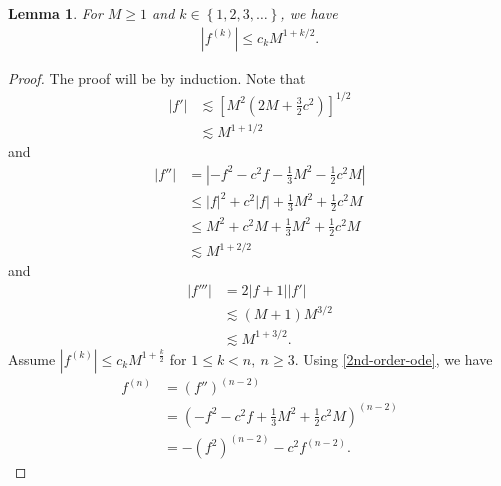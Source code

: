 \documentclass[12pt,reqno]{amsart}
\numberwithin{equation}{section}  %
\newtheorem{lemma}[theorem]{Lemma}
\begin{document}
%
%
%
%
%
%
%
%
%
\begin{lemma}
  For $M \ge 1$ and $k \in \left\{ 1,2,3,\dots \right\}$, we have
%
%
\begin{equation}
\begin{split}
  | f^{(k)} | \le c_{k} M^{1 + k/2}.
\end{split}
\label{eqn:deriv-bound}
\end{equation}
%
%
\label{lem:deriv-bound}
\end{lemma}
%
%
%
\begin{proof}
The proof will be by induction. Note that 
%
%
\begin{equation*}
\begin{split}
  | f' |
  & \lesssim \left [ M^{2}(2M + \frac{3}{2}c^{2}) \right]^{1/2}
  \\
  & \lesssim M^{1 + 1/2}
\end{split}
\end{equation*}
%
and
%
%
\begin{equation*}
\begin{split}
| f'' |
& = | -f^{2} - c^{2} f - \frac{1}{3} M^{2} - \frac{1}{2}c^{2} M
 |
\\
& \le | f |^{2} + c^{2} | f | + \frac{1}{3}M^{2} + \frac{1}{2}c^{2} M
\\
& \le M ^{2} +  c^{2} M  + \frac{1}{3}M^{2} + \frac{1}{2}c^{2} M
\\
& \lesssim M^{1 + 2/2}
\end{split}
\end{equation*}
%
and
%
%
\begin{equation*}
\begin{split}
| f''' | 
& = 2 |f+1| | f' |
\\
& \lesssim (M+1)M^{3/2}
\\
& \lesssim M^{1 + 3/2}.
\end{split}
\end{equation*}
%
%
%
%
Assume $| f^{(k)} | \le c_{k} M^{1 + \frac{k}{2}}$ for $1 \le k < n, \ n \ge 3$.
Using \eqref{2nd-order-ode}, we have
%
%
\begin{equation*}
\begin{split}
  f^{(n)}
  & =
  (f'')^{(n-2)}
  \\
  & = \left( -f^{2} - c^{2} f + \frac{1}{3} M^{2} + \frac{1}{2}c^{2} M
 \right)^{(n-2)}
  \\
  & = -(f^{2})^{(n-2)} - c^{2}f^{(n-2)}.
\end{split}

\end{equation*}
\end{proof}
\end{document}
